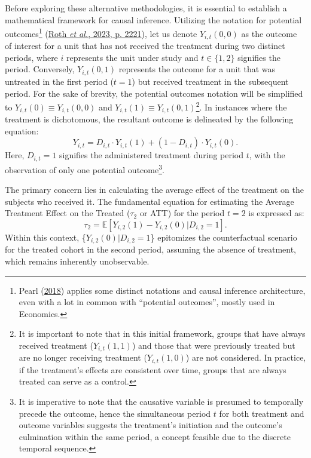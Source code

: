 \documentclass[12pt, a4paper, twoside]{article}
\numberwithin{equation}{subsection} %
\begin{document}
Before exploring these alternative methodologies, it is essential to
establish a mathematical framework for causal inference. Utilizing the
notation for potential outcomes\footnote{Pearl
  (\protect\hyperlink{ref-pearl2018}{2018}) applies some distinct
  notations and causal inference architecture, even with a lot in common
  with ``potential outcomes'', mostly used in Economics.}
(\protect\hyperlink{ref-roth_whats_2023}{Roth \emph{et al.}, 2023, p.
2221}), let us denote \(Y_{i,t}(0, 0)\) as the outcome of interest for a
unit that has not received the treatment during two distinct periods,
where \(i\) represents the unit under study and \(t \in \{1,2\}\)
signifies the period. Conversely, \(Y_{i,t}(0, 1)\) represents the
outcome for a unit that was untreated in the first period (\(t = 1\))
but received treatment in the subsequent period. For the sake of
brevity, the potential outcomes notation will be simplified to
\(Y_{i,t}(0) \equiv Y_{i,t}(0, 0)\) and
\(Y_{i,t}(1) \equiv Y_{i,t}(0, 1)\)\footnote{It is important to note
  that in this initial framework, groups that have always received
  treatment (\(Y_{i,t}(1, 1)\)) and those that were previously treated
  but are no longer receiving treatment (\(Y_{i,t}(1, 0)\)) are not
  considered. In practice, if the treatment's effects are consistent
  over time, groups that are always treated can serve as a control.}. In
instances where the treatment is dichotomous, the resultant outcome is
delineated by the following equation:
\begin{equation} \label{eq-outcome-variable}
Y_{i,t} = D_{i,t} \cdot Y_{i,t}(1) + (1 - D_{i,t}) \cdot Y_{i,t}(0).
\end{equation} Here, \(D_{i,t} = 1\) signifies the administered
treatment during period \(t\), with the observation of only one
potential outcome\footnote{It is imperative to note that the causative
  variable is presumed to temporally precede the outcome, hence the
  simultaneous period \(t\) for both treatment and outcome variables
  suggests the treatment's initiation and the outcome's culmination
  within the same period, a concept feasible due to the discrete
  temporal sequence.}.

The primary concern lies in calculating the average effect of the
treatment on the subjects who received it. The fundamental equation for
estimating the Average Treatment Effect on the Treated (\(\tau_2\) or
ATT) for the period \(t=2\) is expressed as: \begin{equation} 
\label{eq-counterfactual}
   \tau_2 = \mathbb{E}[Y_{i,2}(1) - Y_{i,2}(0) | D_{i,2} = 1].
\end{equation} Within this context, \{\(Y_{i,2}(0) | D_{i,2} = 1\)\}
epitomizes the counterfactual scenario for the treated cohort in the
second period, assuming the absence of treatment, which remains
inherently unobservable.
\end{document}
